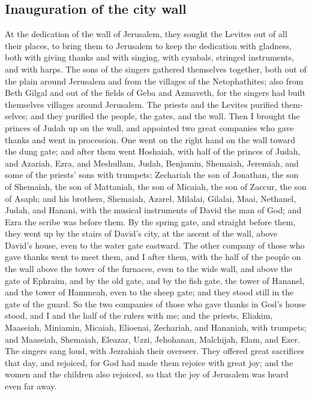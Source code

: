 \begin{paracol}{2}
\begin{otherlanguage}{english}
\hypertarget{inauguration-of-the-city-wall}{%
\subsection{Inauguration of the city
wall}\label{inauguration-of-the-city-wall}}

 At the dedication of the wall of Jerusalem, they sought
the Levites out of all their places, to bring them to Jerusalem to keep
the dedication with gladness, both with giving thanks and with singing,
with cymbals, stringed instruments, and with harps.  The
sons of the singers gathered themselves together, both out of the plain
around Jerusalem and from the villages of the Netophathites;
 also from Beth Gilgal and out of the fields of Geba and
Azmaveth, for the singers had built themselves villages around
Jerusalem.  The priests and the Levites purified
themselves; and they purified the people, the gates, and the wall.
 Then I brought the princes of Judah up on the wall, and
appointed two great companies who gave thanks and went in procession.
One went on the right hand on the wall toward the dung gate;
 and after them went Hoshaiah, with half of the princes
of Judah,  and Azariah, Ezra, and Meshullam,
 Judah, Benjamin, Shemaiah, Jeremiah,  and
some of the priests' sons with trumpets: Zechariah the son of Jonathan,
the son of Shemaiah, the son of Mattaniah, the son of Micaiah, the son
of Zaccur, the son of Asaph;  and his brothers, Shemaiah,
Azarel, Milalai, Gilalai, Maai, Nethanel, Judah, and Hanani, with the
musical instruments of David the man of God; and Ezra the scribe was
before them.  By the spring gate, and straight before
them, they went up by the stairs of David's city, at the ascent of the
wall, above David's house, even to the water gate eastward.
 The other company of those who gave thanks went to meet
them, and I after them, with the half of the people on the wall above
the tower of the furnaces, even to the wide wall,  and
above the gate of Ephraim, and by the old gate, and by the fish gate,
the tower of Hananel, and the tower of Hammeah, even to the sheep gate;
and they stood still in the gate of the guard.  So the
two companies of those who gave thanks in God's house stood, and I and
the half of the rulers with me;  and the priests,
Eliakim, Maaseiah, Miniamin, Micaiah, Elioenai, Zechariah, and Hananiah,
with trumpets;  and Maaseiah, Shemaiah, Eleazar, Uzzi,
Jehohanan, Malchijah, Elam, and Ezer. The singers sang loud, with
Jezrahiah their overseer.  They offered great sacrifices
that day, and rejoiced, for God had made them rejoice with great joy;
and the women and the children also rejoiced, so that the joy of
Jerusalem was heard even far away.


\end{otherlanguage}
\end{paracol}

